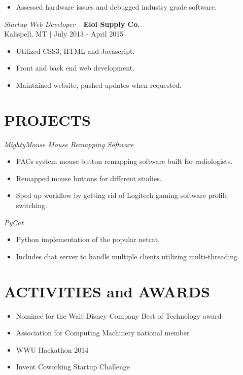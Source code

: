 \documentclass[line,margin]{res}
\begin{document}
\begin{resume}
\begin{itemize}
		\item Assessed hardware issues and debugged industry grade software.
	\end{itemize}
	{\sl Startup Web Developer} -- {\bf Eloi Supply Co.} \\
	{\footnotesize Kalispell, MT $|$  July 2013 - April 2015}\\
	\begin{itemize} \itemsep -2pt
		\item Utilized CSS3, HTML and Javascript.
		\item Front and back end web development.
		\item Maintained website, pushed updates when requested.
	\end{itemize}
	\section{PROJECTS}
		{\sl MightyMouse Mouse Remapping Software}
\begin{itemize}\itemsep -2pt
		\item PACs system mouse button remapping software built for radiologists.
		\item Remapped mouse buttons for different studies.
		\item Sped up workflow by getting rid of Logitech gaming software profile switching.
	\end{itemize}
	{\sl PyCat}
	\begin{itemize}\itemsep -2pt
		\item Python implementation of the popular netcat.
		\item Includes chat server to handle multiple clients utilizing multi-threading.
	\end{itemize}



\section{ACTIVITIES and AWARDS}
	\begin{itemize} \itemsep -3pt
	\item Nominee for the Walt Disney Company Best of Technology award
	\item Association for Computing Machinery national member
	\item WWU Hackathon 2014
	\item Invent Coworking Startup Challenge
	\end{itemize}

\end{resume}
\end{document}

